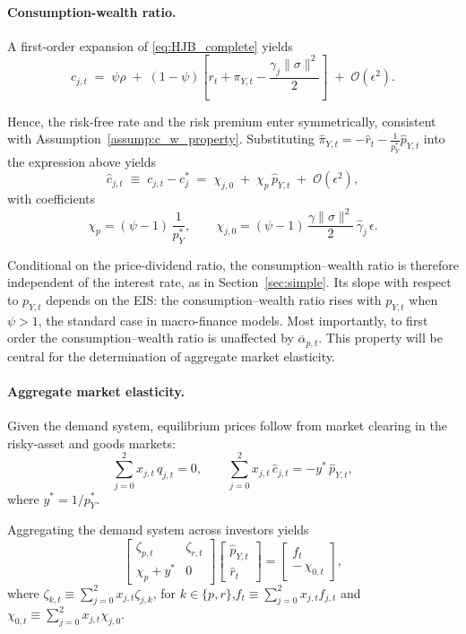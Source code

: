 \documentclass[12pt,english]{article}
\begin{document}
\paragraph{Consumption-wealth ratio.}  
A first-order expansion of \eqref{eq:HJB_complete} yields
\begin{equation}
    c_{j,t}
    \;=\;
    \psi\rho \;+\; (1-\psi)\!\left[r_t + \pi_{Y,t} - \frac{\gamma_j\|\sigma\|^2}{2}\right]
    \;+\; \mathcal{O}(\epsilon^2).
\end{equation}


Hence, the risk-free rate and the risk premium enter symmetrically, consistent with Assumption~\ref{assump:c_w_property}.
Substituting $\hat{\pi}_{Y,t} = -\hat{r}_t - \frac{1}{p_{Y}^{*}}\hat{p}_{Y,t}$ into the expression above
yields
\begin{equation}
    \hat c_{j,t} \;\equiv\; c_{j,t} - c_j^{*}
    \;=\; \chi_{j,0} \;+\; \chi_{p}\,\hat{p}_{Y,t} \;+\; \mathcal{O}(\epsilon^2),
\end{equation}
with coefficients
\[
    \chi_{p}=(\psi-1)\,\frac{1}{p_{Y}^{*}},
    \qquad 
    \chi_{j,0}=(\psi-1)\,\frac{\gamma\|\sigma\|^2}{2}\,\hat{\gamma}_j\,\epsilon.
\]

Conditional on the price-dividend ratio, the consumption--wealth ratio is therefore independent of the interest rate, as in Section~\ref{sec:simple}.
Its slope with respect to $p_{Y,t}$ depends on the EIS:
the consumption--wealth ratio rises with $p_{Y,t}$ when $\psi>1$, the standard case in macro-finance models.
Most importantly, to first order the consumption--wealth ratio is unaffected by $\overline{\alpha}_{p,t}$.
This property will be central for the determination of aggregate market elasticity.

\paragraph{Aggregate market elasticity.}  
Given the demand system, equilibrium prices follow from market clearing in the risky-asset and goods markets:
\[
    \sum_{j=0}^2 x_{j,t}\, q_{j,t} = 0,
    \qquad
    \sum_{j=0}^2 x_{j,t}\, \hat{c}_{j,t} = -y^*\,\hat{p}_{Y,t},
\]
where $y^* = 1/p_{Y}^{*}$.

Aggregating the demand system across investors yields
\[
    \begin{bmatrix}
        \zeta_{p,t} & \zeta_{r,t} \\
        \chi_p + y^* & 0
    \end{bmatrix}
    \begin{bmatrix}
        \hat{p}_{Y,t} \\[4pt]
        \hat{r}_t
    \end{bmatrix}
    =
    \begin{bmatrix}
        f_t \\[4pt]
        -\,\chi_{0,t}
    \end{bmatrix},
\]
where $\zeta_{k,t} \equiv \sum_{j=0}^2 x_{j,t} \zeta_{j,k}$, for $k \in \{p,r\}$,$f_t \equiv \sum_{j=0}^2 x_{j,t} f_{j,t}$ and $\chi_{0,t} \equiv \sum_{j=0}^2 x_{j,t} \chi_{j,0}$.
\end{document}
